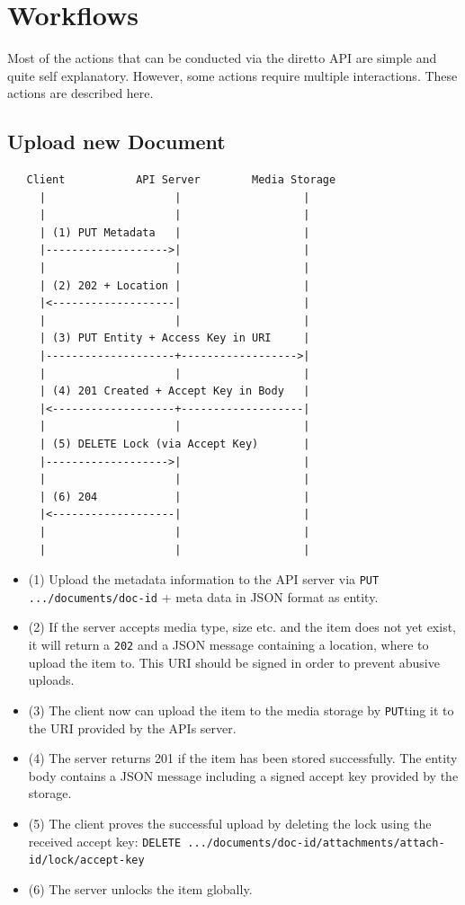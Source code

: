 \documentclass[10pt]{article}
\begin{document}
\section{Workflows}
Most of the actions that can be conducted via the diretto API are simple and quite self explanatory. However, some actions require multiple interactions. These actions are described here.
\subsection{Upload new Document}
\begin{verbatim}
   Client           API Server        Media Storage
     |                    |                   |
     |                    |                   |
     | (1) PUT Metadata   |                   |
     |------------------->|                   |
     |                    |                   |
     | (2) 202 + Location |                   |
     |<-------------------|                   |
     |                    |                   |
     | (3) PUT Entity + Access Key in URI     |
     |--------------------+------------------>|
     |                    |                   |
     | (4) 201 Created + Accept Key in Body   |
     |<-------------------+-------------------|
     |                    |                   |
     | (5) DELETE Lock (via Accept Key)       |
     |------------------->|                   |
     |                    |                   |
     | (6) 204            |                   |
     |<-------------------|                   |
     |                    |                   |
     |                    |                   |
\end{verbatim}
\begin{itemize}
\item (1) Upload the metadata information to the API server via \texttt{PUT .../documents/{doc-id}} + meta data in JSON format as entity. 
\item (2) If the server accepts media type, size etc. and the item does not yet exist, it will return a \texttt{202} and a JSON message containing a location, where to upload the item to. This URI should be signed in order to prevent abusive uploads.
\item (3) The client now can upload the item to the media storage by \texttt{PUT}ting it to the URI provided by the APIs server.
\item (4) The server returns 201 if the item has been stored successfully. The entity body contains a JSON message including a signed accept key provided by the storage.  
\item (5) The client proves the successful upload by deleting the lock using the received accept key: \texttt{DELETE .../documents/{doc-id}/attachments/{attach-id}/lock/{accept-key}}
\item (6) The server unlocks the item globally.
\end{itemize}
\end{document}
